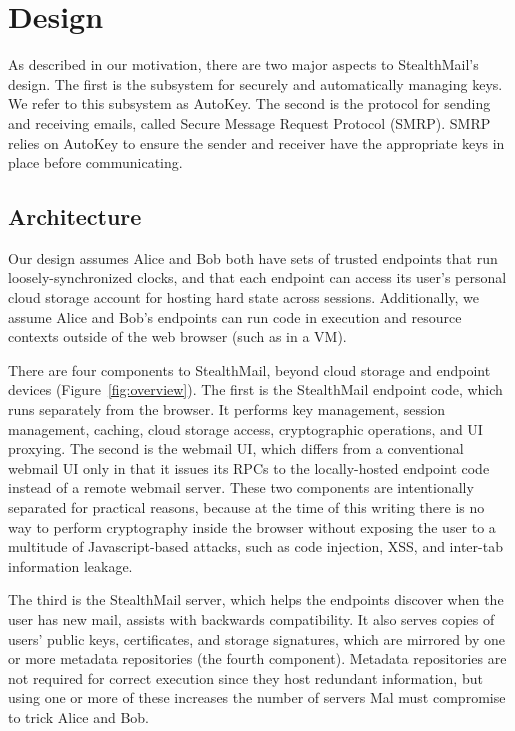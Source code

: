 \section{Design}
\label{sec:design}

As described in our motivation, there are two major aspects to StealthMail’s design.  The first is the subsystem for securely and automatically managing keys.  We refer to this subsystem as AutoKey.  The second is the protocol for sending and receiving emails, called Secure Message Request Protocol (SMRP).  SMRP relies on AutoKey to ensure the sender and receiver have the appropriate keys in place before communicating.

\subsection{Architecture}
Our design assumes Alice and Bob both have sets of trusted endpoints that run loosely-synchronized clocks, and that each endpoint can access its user’s personal cloud storage account for hosting hard state across sessions.  Additionally, we assume Alice and Bob's endpoints can run code in execution and resource contexts outside of the web browser (such as in a VM).

There are four components to StealthMail, beyond cloud storage and endpoint devices (Figure~\ref{fig:overview}). The first is the StealthMail endpoint code, which runs separately from the browser.  It performs key management, session management, caching, cloud storage access, cryptographic operations, and UI proxying. The second is the webmail UI, which differs from a conventional webmail UI only in that it issues its RPCs to the locally-hosted endpoint code instead of a remote webmail server.  These two components are intentionally separated for practical reasons, because at the time of this writing there is no way to perform cryptography inside the browser without exposing the user to a multitude of Javascript-based attacks, such as code injection, XSS, and inter-tab information leakage.

The third is the StealthMail server, which helps the endpoints discover when the user has new mail, assists with backwards compatibility.  It also serves copies of users’ public keys, certificates, and storage signatures, which are mirrored by one or more metadata repositories (the fourth component).  Metadata repositories are not required for correct execution since they host redundant information, but using one or more of these increases the number of servers Mal must compromise to trick Alice and Bob.

